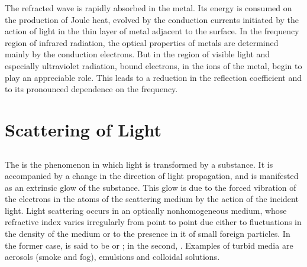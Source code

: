 The refracted wave is rapidly absorbed in the metal. Its energy is consumed on the production of Joule heat, evolved by the conduction currents initiated by the action of light in the thin layer of metal adjacent to the surface. In the  frequency region of infrared radiation, the optical properties of metals are determined mainly by the conduction electrons. But in the region of visible light and especially ultraviolet radiation, bound electrons, in the ions of the metal, begin to play an appreciable role. This leads to a reduction in the reflection coefficient and to its pronounced dependence on the frequency.

\section{Scattering of Light}
\label{sec-34.3} 


\subsection{}\label{34.3.1} The  is the phenomenon in which light is transformed by a substance. It is accompanied by a change in the direction of light propagation, and is manifested as an extrinsic glow of the substance. This glow is due to the forced vibration of the electrons in the atoms of the scattering medium by the action of the incident light. Light scattering occurs in an optically nonhomogeneous medium, whose refractive index varies irregularly from point to point due either to fluctuations
in the density of the medium or to the presence in it of small
foreign particles. In the former case,  is said to be  or ; in the second, . Examples of turbid media are aerosols (smoke and fog), emulsions and colloidal solutions.

